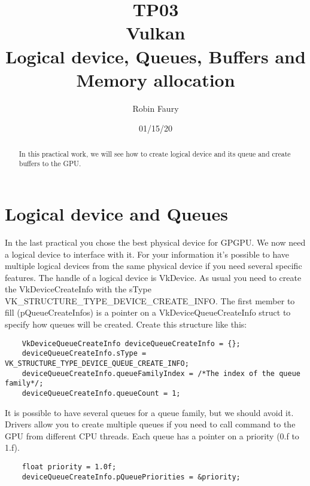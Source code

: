 \documentclass{article}
\begin{document}
\title{TP03\\Vulkan\\Logical device, Queues, Buffers and Memory allocation}
\author{Robin Faury}
\date{01/15/20}
\maketitle

\begin{abstract}
	In this practical work, we will see how to create logical device and its queue and create buffers to the GPU.
\end{abstract}

\section{Logical device and Queues}
In the last practical you chose the best physical device for GPGPU. We now need a logical device to interface with it. For your information it's possible to have multiple logical devices from the same physical device if you need several specific features. The handle of a logical device is VkDevice. As usual you need to create the VkDeviceCreateInfo with the sType VK\_STRUCTURE\_TYPE\_DEVICE\_CREATE\_INFO. The first member to fill (pQueueCreateInfos) is a pointer on a VkDeviceQueueCreateInfo struct to specify how queues will be created. Create this structure like this:

\begin{lstlisting}
	VkDeviceQueueCreateInfo deviceQueueCreateInfo = {};
	deviceQueueCreateInfo.sType = VK_STRUCTURE_TYPE_DEVICE_QUEUE_CREATE_INFO;
	deviceQueueCreateInfo.queueFamilyIndex = /*The index of the queue family*/;
	deviceQueueCreateInfo.queueCount = 1;
\end{lstlisting}

It is possible to have several queues for a queue family, but we should avoid it. Drivers allow you to create multiple queues if you need to call command to the GPU from different CPU threads. Each queue has a pointer on a priority (0.f to 1.f).

\begin{lstlisting}
	float priority = 1.0f;
	deviceQueueCreateInfo.pQueuePriorities = &priority;
\end{lstlisting}
\end{document}
